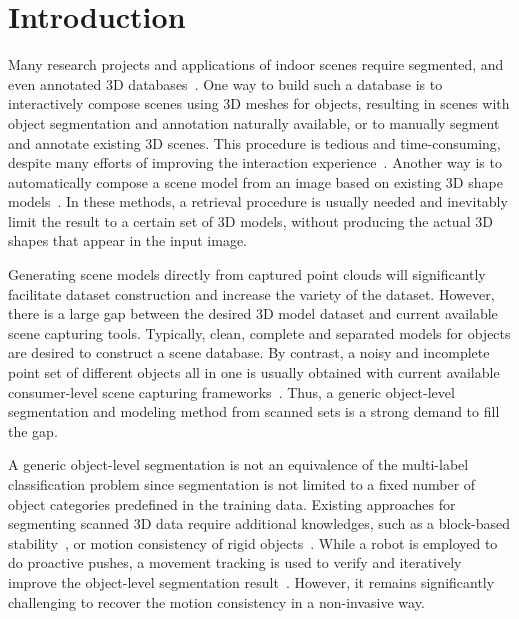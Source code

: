 \section{Introduction}
\label{sec:intro}
Many research projects and applications of indoor scenes require segmented, and even annotated 3D databases~\cite{SearchClassify,SceneFromExample,Fisher:2012:ESO:2366145.2366154,Chen:2014:ASM:2661229.2661239,Fisher:ActivityCentricSceneSynthesis}.
%
One way to build such a database is to interactively compose scenes using 3D meshes for objects, resulting in scenes with object segmentation and annotation naturally available, or to manually segment and annotate existing 3D scenes. This procedure is tedious and time-consuming, despite many efforts of improving the interaction experience~\cite{Merrell:2011:IFL:2010324.1964982, Xu:2013:SSC:2461912.2461968}. 
%
Another way is to automatically compose a scene model from an image based on existing 3D shape models~\cite{Liu2015Model,Chen:2014:ASM:2661229.2661239}.  
In these methods, a retrieval procedure is usually needed and inevitably limit the result to a certain set of 3D models, without producing the actual 3D shapes that appear in the input image.

Generating scene models directly from captured point clouds will significantly facilitate dataset construction and increase the variety of the dataset. 
However, there is a large gap between the desired 3D model dataset and current available scene capturing tools. Typically, clean, complete and separated models for objects are desired to construct a scene database. 
By contrast, a noisy and incomplete point set of different objects all in one is usually obtained with current available consumer-level scene capturing frameworks~\cite{KinectFusion,VXH,dai2016bundlefusion}. 
Thus, a generic object-level segmentation and modeling method from scanned sets is a strong demand to fill the gap.

A generic object-level segmentation is not an equivalence of the multi-label classification problem since segmentation is not limited to a fixed number of object categories predefined in the training data. 
Existing approaches for segmenting scanned 3D data require additional knowledges, such as a block-based stability~\cite{3DReasoningfromBlockstoStability}, or motion consistency of rigid objects~\cite{Xu:2015:ACS:2816795.2818075}. 
While a robot is employed to do proactive pushes, a movement tracking is used to verify and iteratively improve the object-level segmentation result~\cite{Xu:2015:ACS:2816795.2818075}.
However, it remains significantly challenging to recover the motion consistency in a non-invasive way. 

